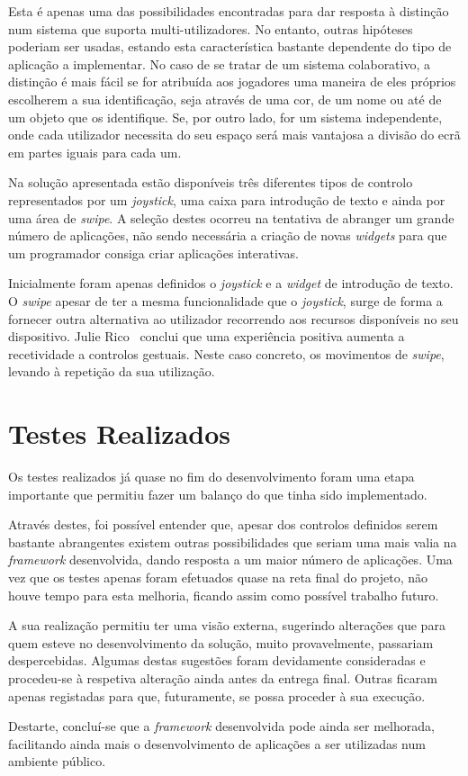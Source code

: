 Esta é apenas uma das possibilidades encontradas para dar resposta à distinção num sistema que suporta multi-utilizadores. No entanto, outras hipóteses poderiam ser usadas, estando esta característica bastante dependente do tipo de aplicação a implementar. No caso de se tratar de um sistema colaborativo, a distinção é mais fácil se for atribuída aos jogadores uma maneira de eles próprios escolherem a sua identificação, seja através de uma cor, de um nome ou até de um objeto que os identifique. Se, por outro lado, for um sistema independente, onde cada utilizador necessita do seu espaço será mais vantajosa a divisão do ecrã em partes iguais para cada um.

Na solução apresentada estão disponíveis três diferentes tipos de controlo representados por um \textit{joystick}, uma caixa para introdução de texto e ainda por uma área de \textit{swipe}. A seleção destes ocorreu na tentativa de abranger um grande número de aplicações, não sendo necessária a criação de novas \textit{widgets} para que um programador consiga criar aplicações interativas.

Inicialmente foram apenas definidos o \textit{joystick} e a \textit{widget} de introdução de texto. O \textit{swipe} apesar de ter a mesma funcionalidade que o \textit{joystick}, surge de forma a fornecer outra alternativa ao utilizador recorrendo aos recursos disponíveis no seu dispositivo.
Julie Rico~\cite{Rico2010} conclui que uma experiência positiva aumenta a recetividade a controlos gestuais. Neste caso concreto, os movimentos de \textit{swipe}, levando à repetição da sua utilização.


\section{Testes Realizados}

Os testes realizados já quase no fim do desenvolvimento foram uma etapa importante que permitiu fazer um balanço do que tinha sido implementado.

Através destes, foi possível entender que, apesar dos controlos definidos serem bastante abrangentes existem outras possibilidades que seriam uma mais valia na \textit{framework} desenvolvida, dando resposta a um maior número de aplicações. Uma vez que os testes apenas foram efetuados quase na reta final do projeto, não houve tempo para esta melhoria, ficando assim como possível trabalho futuro.

A sua realização permitiu ter uma visão externa, sugerindo alterações que para quem esteve no desenvolvimento da solução, muito provavelmente, passariam despercebidas. Algumas destas sugestões foram devidamente consideradas e procedeu-se à respetiva alteração ainda antes da entrega final. Outras ficaram apenas registadas para que, futuramente, se possa proceder à sua execução.

Destarte, concluí-se que a \textit{framework} desenvolvida pode ainda ser melhorada, facilitando ainda mais o desenvolvimento de aplicações a ser utilizadas num ambiente público.









